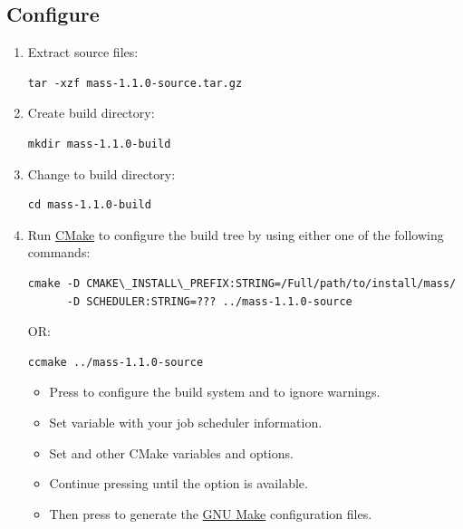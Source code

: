 \documentclass[letterpaper,10pt,english]{sphinxhowto}
\begin{document}
\subsection{Configure}
\label{installation:configure}\begin{enumerate}
\item {} 
Extract source files:

\begin{Verbatim}[commandchars=\\\{\}]
tar -xzf mass-1.1.0-source.tar.gz
\end{Verbatim}

\item {} 
Create build directory:

\begin{Verbatim}[commandchars=\\\{\}]
mkdir mass-1.1.0-build
\end{Verbatim}

\item {} 
Change to build directory:

\begin{Verbatim}[commandchars=\\\{\}]
cd mass-1.1.0-build
\end{Verbatim}

\item {} 
Run \href{http://www.cmake.org/}{CMake} to configure the build tree by using either one of the following commands:

\begin{Verbatim}[commandchars=\\\{\}]
cmake -D CMAKE\_INSTALL\_PREFIX:STRING=/Full/path/to/install/mass/
      -D SCHEDULER:STRING=??? ../mass-1.1.0-source
\end{Verbatim}

OR:

\begin{Verbatim}[commandchars=\\\{\}]
ccmake ../mass-1.1.0-source
\end{Verbatim}
\begin{itemize}
\item {} 
Press  to configure the build system and  to ignore warnings.

\item {} 
Set  variable with your job scheduler information.

\item {} 
Set  and other CMake variables and options.

\item {} 
Continue pressing  until the option  is available.

\item {} 
Then press  to generate the \href{http://www.gnu.org/software/make/}{GNU Make} configuration files.

\end{itemize}

\end{enumerate}
\end{document}
